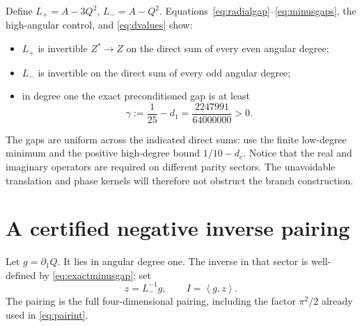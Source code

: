 \documentclass[11pt,a4paper]{article}
\theoremstyle{definition}\newtheorem{definition}[theorem]{Definition}
\theoremstyle{remark}\newtheorem{remark}[theorem]{Remark}
\newcommand{\ip}[2]{\left\langle #1,#2\right\rangle}
\begin{document}
Define \(L_+=A-3Q^2\), \(L_-=A-Q^2\). Equations~\eqref{eq:radialgap}--\eqref{eq:minusgaps}, the high-angular control, and \eqref{eq:dvalues} show:
\begin{itemize}[leftmargin=20pt,itemsep=1pt]
\item \(L_+\) is invertible \(Z^*\to Z\) on the direct sum of every even angular degree;
\item \(L_-\) is invertible on the direct sum of every odd angular degree;
\item in degree one the exact preconditioned gap is at least
\begin{equation}\label{eq:exactminusgap}
 \gamma:=\frac1{25}-d_1=\frac{2247991}{64000000}>0.
\end{equation}
\end{itemize}
The gaps are uniform across the indicated direct sums: use the finite low-degree minimum and the positive high-degree bound \(1/10-d_c\). Notice that the real and imaginary operators are required on different parity sectors. The unavoidable translation and phase kernels will therefore not obstruct the branch construction.

\section{A certified negative inverse pairing}

Let \(g=\partial_1Q\). It lies in angular degree one. The inverse in that sector is well-defined by \eqref{eq:exactminusgap}; set
\begin{equation}\label{eq:Idefinition}
 z=L_-^{-1}g,\qquad I=\ip g z.
\end{equation}
The pairing is the full four-dimensional pairing, including the factor \(\pi^2/2\) already used in \eqref{eq:pairint}.
\end{document}
